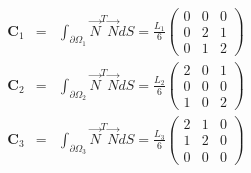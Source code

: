 \begin{eqnarray}
{\bm C}_1 &=& \int_{\partial\Omega_1} \vec{N}^T\vec{N} dS 
= \frac{L_1}{6}
\left(
\begin{array}{ccc}
0 &0 &0\\
0 &2 &1\\
0 &1 &2
\end{array}
\right) \\
{\bm C}_2 &=& \int_{\partial\Omega_2} \vec{N}^T\vec{N} dS 
= \frac{L_2}{6}
\left(
\begin{array}{ccc}
2 &0 &1\\
0 &0 &0\\
1 &0 &2
\end{array}
\right) \\
{\bm C}_3 &=& \int_{\partial\Omega_3} \vec{N}^T\vec{N} dS 
= \frac{L_3}{6}
\left(
\begin{array}{ccc}
2 &1 &0\\
1 &2 &0\\
0 &0 &0
\end{array}
\right) 
\end{eqnarray}




